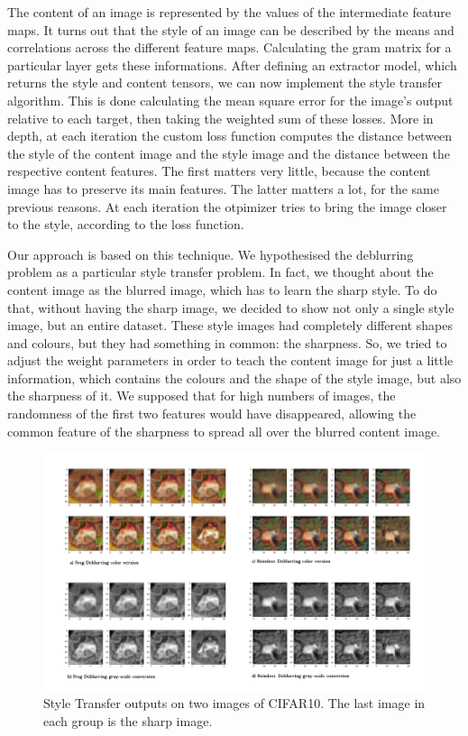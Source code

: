 \documentclass[12pt,a4paper]{article}
\begin{document}
The content of an image is represented by the values of the intermediate feature maps. It turns out that the style of an image can be described by the means and correlations across the different feature maps. Calculating the gram matrix for a particular layer gets these informations.
After defining an extractor model, which returns the style and content tensors, we can now implement the style transfer algorithm. This is done calculating the mean square error for the image's output relative to each target, then taking the weighted sum of these losses. More in depth, at each iteration the custom loss function computes the distance between the style of the content image and the style image and the distance between the respective content features. The first matters very little, because the content image has to preserve its main features. The latter matters a lot, for the same previous reasons. At each iteration the otpimizer tries to bring the image closer to the style, according to the loss function.

Our approach is based on this technique. We hypothesised the deblurring problem as a particular style transfer problem. In fact, we thought about the content image as the blurred image, which has to learn the sharp style. To do that, without having the sharp image, we decided to show not only a single style image, but an entire dataset. These style images had completely different shapes and colours, but they had something in common: the sharpness. So, we tried to adjust the weight parameters in order to teach the content image for just a little information, which contains the colours and the shape of the style image, but also the sharpness of it. We supposed that for high numbers of images, the randomness of the first two features would have disappeared, allowing the common feature of the sharpness to spread all over the blurred content image.
\begin{figure}[hptb]
\centering
\includegraphics[scale=0.1]{style_outputs.png} 
\caption{Style Transfer outputs on two images of CIFAR10. The last image in each group is the sharp image.}
\label{style_outputs}
\end{figure}
\end{document}
